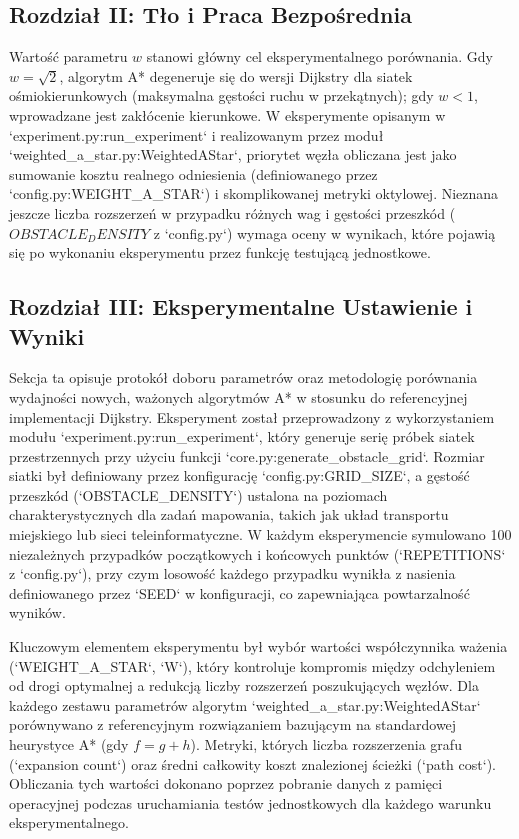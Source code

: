 \subsection{Rozdział II: Tło i Praca Bezpośrednia}
Wartość parametru $w$ stanowi główny cel eksperymentalnego porównania. Gdy $w = \sqrt{2}$, algorytm A* degeneruje się do wersji Dijkstry dla siatek ośmiokierunkowych (maksymalna gęstości ruchu w przekątnych); gdy $w < 1$, wprowadzane jest zakłócenie kierunkowe. W eksperymente opisanym w `experiment.py:run_experiment` i realizowanym przez moduł `weighted_a_star.py:WeightedAStar`, priorytet węzła obliczana jest jako sumowanie kosztu realnego odniesienia (definiowanego przez `config.py:WEIGHT_A_STAR`) i skomplikowanej metryki oktylowej. Nieznana jeszcze liczba rozszerzeń w przypadku różnych wag i gęstości przeszkód ($OBSTACLE_DENSITY$ z `config.py`) wymaga oceny w wynikach, które pojawią się po wykonaniu eksperymentu przez funkcję testującą jednostkowe.

\subsection{Rozdział III: Eksperymentalne Ustawienie i Wyniki}
Sekcja ta opisuje protokół doboru parametrów oraz metodologię porównania wydajności nowych, ważonych algorytmów A* w stosunku do referencyjnej implementacji Dijkstry. Eksperyment został przeprowadzony z wykorzystaniem modułu `experiment.py:run_experiment`, który generuje serię próbek siatek przestrzennych przy użyciu funkcji `core.py:generate_obstacle_grid`. Rozmiar siatki był definiowany przez konfigurację `config.py:GRID_SIZE`, a gęstość przeszkód (`OBSTACLE_DENSITY`) ustalona na poziomach charakterystycznych dla zadań mapowania, takich jak układ transportu miejskiego lub sieci teleinformatyczne. W każdym eksperymencie symulowano 100 niezależnych przypadków początkowych i końcowych punktów (`REPETITIONS` z `config.py`), przy czym losowość każdego przypadku wynikła z nasienia definiowanego przez `SEED` w konfiguracji, co zapewniająca powtarzalność wyników.

Kluczowym elementem eksperymentu był wybór wartości współczynnika ważenia (`WEIGHT_A_STAR`, `W`), który kontroluje kompromis między odchyleniem od drogi optymalnej a redukcją liczby rozszerzeń poszukujących węzłów. Dla każdego zestawu parametrów algorytm `weighted_a_star.py:WeightedAStar` porównywano z referencyjnym rozwiązaniem bazującym na standardowej heurystyce A* (gdy $f = g + h$). Metryki, których liczba rozszerzenia grafu (`expansion count`) oraz średni całkowity koszt znalezionej ścieżki (`path cost`). Obliczania tych wartości dokonano poprzez pobranie danych z pamięci operacyjnej podczas uruchamiania testów jednostkowych dla każdego warunku eksperymentalnego.


